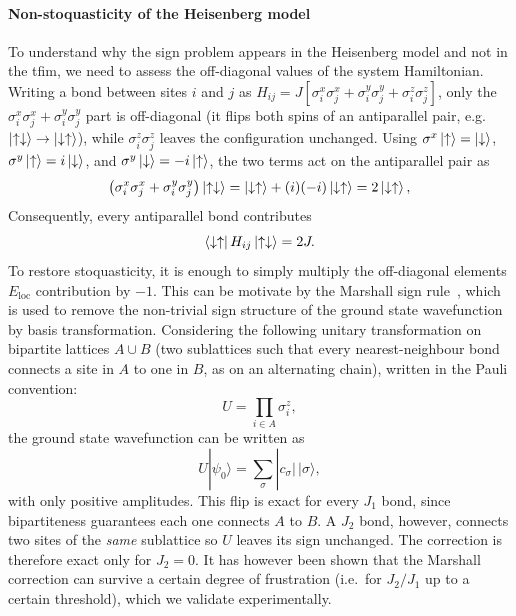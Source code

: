 \documentclass[10pt,a4paper]{article}
\numberwithin{equation}{section}
\begin{document}
\paragraph{Non-stoquasticity of the Heisenberg model} To understand why the sign problem appears in the Heisenberg model and not in the \gls{tfim}, we need to assess the off-diagonal values of the system Hamiltonian. Writing a bond between sites $i$ and $j$ as $H_{ij}=J[\sigma^x_i\sigma^x_j+\sigma^y_i\sigma^y_j+\sigma^z_i\sigma^z_j]$, only the $\sigma^x_i\sigma^x_j+\sigma^y_i\sigma^y_j$ part is off-diagonal (it flips both spins of an antiparallel pair, e.g.\ $\ket{\uparrow\downarrow}\to\ket{\downarrow\uparrow}$), while $\sigma^z_i\sigma^z_j$ leaves the configuration unchanged. Using $\sigma^x\ket{\uparrow}=\ket{\downarrow}$, $\sigma^y\ket{\uparrow}=i\ket{\downarrow}$, and $\sigma^y\ket{\downarrow}=-i\ket{\uparrow}$, the two terms act on the antiparallel pair as
\begin{equation}
\left(\sigma^x_i\sigma^x_j+\sigma^y_i\sigma^y_j\right)\ket{\uparrow\downarrow} = \ket{\downarrow\uparrow} + (i)(-i)\ket{\downarrow\uparrow} = 2\ket{\downarrow\uparrow},
\end{equation}
Consequently, every antiparallel bond contributes
\begin{equation}
\bra{\downarrow\uparrow}H_{ij}\ket{\uparrow\downarrow}=2J.
\end{equation}
To restore stoquasticity, it is enough to simply multiply the off-diagonal elements $E_\text{loc}$ contribution by $-1$. This can be motivate by the Marshall sign rule~\cite{Marshall_1955}, which is used to remove the non-trivial sign structure of the ground state wavefunction by basis transformation. Considering the following unitary transformation on bipartite lattices $A \cup B$ (two sublattices such that every nearest-neighbour bond connects a site in $A$ to one in $B$, as on an alternating chain), written in the Pauli convention:
\[
U = \prod_{i \in A} \sigma_i^z,
\]
the ground state wavefunction can be written as
\[
U |\psi_0\rangle = \sum_{\sigma} |c_\sigma| \, |\sigma\rangle,
\]
with only positive amplitudes. This flip is exact for every $J_1$ bond, since bipartiteness guarantees each one connects $A$ to $B$. A $J_2$ bond, however, connects two sites of the \emph{same} sublattice so $U$ leaves its sign unchanged. The correction is therefore exact only for $J_2=0$. It has however been shown that the Marshall correction can survive a certain degree of frustration (i.e.\ for $J_2/J_1$ up to a certain threshold)\cite{Richter_1994,Voigt_2000}, which we validate experimentally.
\end{document}
